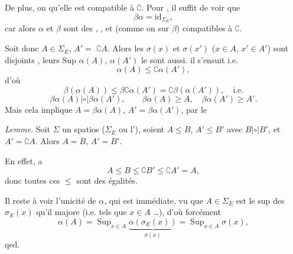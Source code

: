\documentclass[11pt,a4paper]{article}
\begin{document}
De plus, on  qu'elle est compatible à $\complement$. Pour , il suffit de voir que
\[
  \beta\alpha = \mathrm{id}_{\Sigma_E} ,
\]
car alors $\alpha$ et $\beta$ sont des  ,  , et (comme on  sur $\beta$) compatibles à $\complement$.

Soit donc $A \in \Sigma_E$, $A' =$  $\complement A$. Alors les $\sigma(x)$ et $\sigma(x')$ ($x \in A$, $x' \in A'$) sont disjoints ,  leurs Sup \struck{\ill{}} $\alpha(A)$, $\alpha(A')$ le sont aussi. 
  il s'ensuit i.e.
\[
  \alpha(A) \leq \complement\alpha(A') ,
\]
d'où
\[
  \beta(\alpha(A)) \leq \beta\complement\alpha(A') = \complement\beta(\alpha(A')) , \quad \text{i.e.}
\]
\[
  \beta\alpha(A) \mathrel{|\circ|} \beta\alpha(A') ,
  \qquad
  \beta\alpha(A) \geq A , \quad \beta\alpha(A') \geq A' .
\]
Mais cela implique
$A = \beta\alpha(A)$, $A' = \beta\alpha(A')$, par le

\emph{Lemme.} Soit $\Sigma$ un spatios ($\Sigma_E$ ou l'), soient $A \leq B$, $A' \leq B'$ avec $B \mathrel{|\circ|} B'$, et $A' = \complement A$. Alors $A = B$, $A' = B'$.

En effet,  a
\[
  A \leq B \leq \complement B' \leq \complement A' = A ,
\]
donc toutes ces $\leq$ sont des égalités.


Il reste à voir l'unicité de $\alpha$, qui est immédiate, vu que  $A \in \Sigma_E$ est le sup des $\sigma_E(x)$ qu'il majore (i.e. tels que $x \in A$ \ldots),  d'où forcément
\[
  \alpha(A) = \operatorname{Sup}_{x \in A} \underbrace{\alpha(\sigma_E(x))}_{\sigma(x)} = \operatorname{Sup}_{x \in A} \sigma(x) ,
\]
qed.

\end{document}
